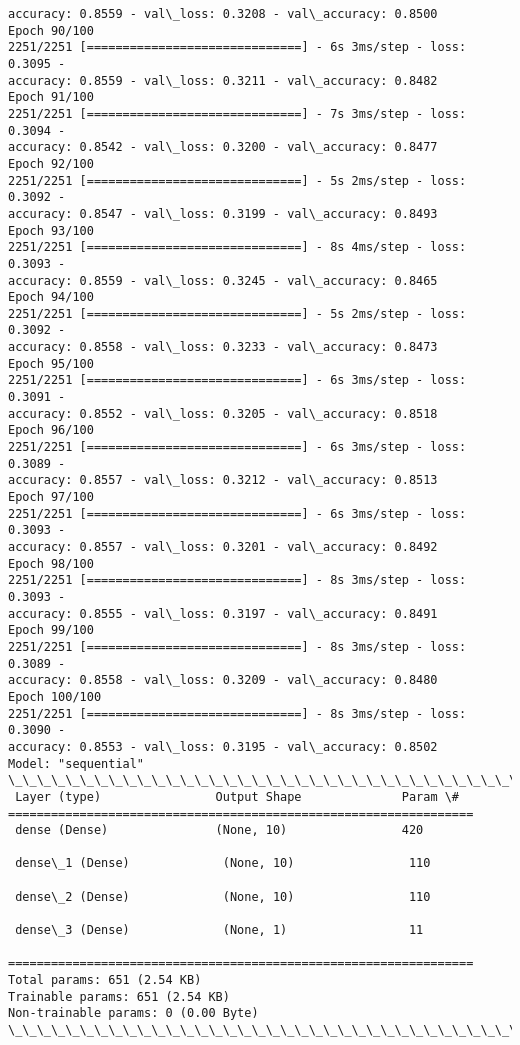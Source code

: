 \documentclass[11pt]{article}
\begin{document}
\begin{Verbatim}[commandchars=\\\{\}]
accuracy: 0.8559 - val\_loss: 0.3208 - val\_accuracy: 0.8500
Epoch 90/100
2251/2251 [==============================] - 6s 3ms/step - loss: 0.3095 -
accuracy: 0.8559 - val\_loss: 0.3211 - val\_accuracy: 0.8482
Epoch 91/100
2251/2251 [==============================] - 7s 3ms/step - loss: 0.3094 -
accuracy: 0.8542 - val\_loss: 0.3200 - val\_accuracy: 0.8477
Epoch 92/100
2251/2251 [==============================] - 5s 2ms/step - loss: 0.3092 -
accuracy: 0.8547 - val\_loss: 0.3199 - val\_accuracy: 0.8493
Epoch 93/100
2251/2251 [==============================] - 8s 4ms/step - loss: 0.3093 -
accuracy: 0.8559 - val\_loss: 0.3245 - val\_accuracy: 0.8465
Epoch 94/100
2251/2251 [==============================] - 5s 2ms/step - loss: 0.3092 -
accuracy: 0.8558 - val\_loss: 0.3233 - val\_accuracy: 0.8473
Epoch 95/100
2251/2251 [==============================] - 6s 3ms/step - loss: 0.3091 -
accuracy: 0.8552 - val\_loss: 0.3205 - val\_accuracy: 0.8518
Epoch 96/100
2251/2251 [==============================] - 6s 3ms/step - loss: 0.3089 -
accuracy: 0.8557 - val\_loss: 0.3212 - val\_accuracy: 0.8513
Epoch 97/100
2251/2251 [==============================] - 6s 3ms/step - loss: 0.3093 -
accuracy: 0.8557 - val\_loss: 0.3201 - val\_accuracy: 0.8492
Epoch 98/100
2251/2251 [==============================] - 8s 3ms/step - loss: 0.3093 -
accuracy: 0.8555 - val\_loss: 0.3197 - val\_accuracy: 0.8491
Epoch 99/100
2251/2251 [==============================] - 8s 3ms/step - loss: 0.3089 -
accuracy: 0.8558 - val\_loss: 0.3209 - val\_accuracy: 0.8480
Epoch 100/100
2251/2251 [==============================] - 8s 3ms/step - loss: 0.3090 -
accuracy: 0.8553 - val\_loss: 0.3195 - val\_accuracy: 0.8502
Model: "sequential"
\_\_\_\_\_\_\_\_\_\_\_\_\_\_\_\_\_\_\_\_\_\_\_\_\_\_\_\_\_\_\_\_\_\_\_\_\_\_\_\_\_\_\_\_\_\_\_\_\_\_\_\_\_\_\_\_\_\_\_\_\_\_\_\_\_
 Layer (type)                Output Shape              Param \#
=================================================================
 dense (Dense)               (None, 10)                420

 dense\_1 (Dense)             (None, 10)                110

 dense\_2 (Dense)             (None, 10)                110

 dense\_3 (Dense)             (None, 1)                 11

=================================================================
Total params: 651 (2.54 KB)
Trainable params: 651 (2.54 KB)
Non-trainable params: 0 (0.00 Byte)
\_\_\_\_\_\_\_\_\_\_\_\_\_\_\_\_\_\_\_\_\_\_\_\_\_\_\_\_\_\_\_\_\_\_\_\_\_\_\_\_\_\_\_\_\_\_\_\_\_\_\_\_\_\_\_\_\_\_\_\_\_\_\_\_\_
    \end{Verbatim}
\end{document}
